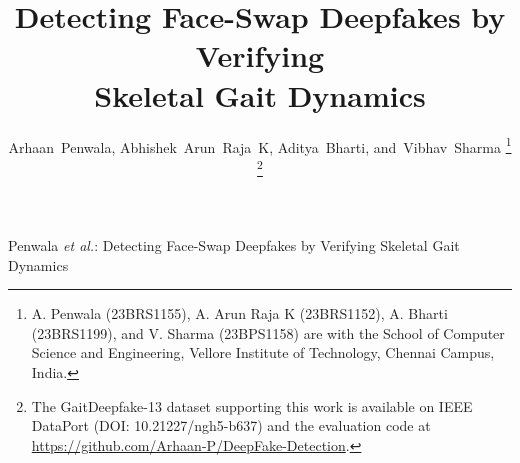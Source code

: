 \documentclass[journal]{IEEEtran}
\begin{document}
\title{Detecting Face-Swap Deepfakes by Verifying\\Skeletal Gait Dynamics}

\author{Arhaan~Penwala,
        Abhishek~Arun~Raja~K,
        Aditya~Bharti,
        and~Vibhav~Sharma%
\thanks{A. Penwala (23BRS1155), A. Arun Raja K (23BRS1152), A. Bharti
(23BRS1199), and V. Sharma (23BPS1158) are with the School of Computer Science
and Engineering, Vellore Institute of Technology, Chennai Campus, India.}
\thanks{The GaitDeepfake-13 dataset supporting this work is available on IEEE
DataPort (DOI: 10.21227/ngh5-b637) and the evaluation code at
\protect\url{https://github.com/Arhaan-P/DeepFake-Detection}.}}

%
{Penwala \MakeLowercase{\textit{et al.}}: Detecting Face-Swap Deepfakes by Verifying Skeletal Gait Dynamics}

\maketitle
\end{document}
